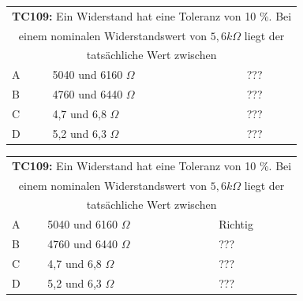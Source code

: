 \begin{frame}
	\begin{small}	
	\begin{tabular}{|l|l|l|}
	\hline
		\multicolumn{3}{|c|}{\textbf{TC109:} Ein Widerstand hat eine Toleranz von 10 \%. Bei }\\
		\multicolumn{3}{|c|}{einem nominalen Widerstandswert von $5,6 k\Omega$ liegt der}\\
		\multicolumn{3}{|c|}{tatsächliche Wert zwischen}\\
		\hline
		A & 5040 und 6160 $\Omega$ & ??? \\ \hline
		B & 4760 und 6440 $\Omega$ & ??? \\ \hline
		C & 4,7 und 6,8 $\Omega$ & ??? \\ \hline
		D & 5,2 und 6,3 $\Omega$ & ??? \\ \hline 		
	\end{tabular}
	\end{small}
\end{frame}
\begin{frame}
	\begin{small}	
	\begin{tabular}{|l|l|l|}
	\hline
		\multicolumn{3}{|c|}{\textbf{TC109:} Ein Widerstand hat eine Toleranz von 10 \%. Bei }\\
		\multicolumn{3}{|c|}{einem nominalen Widerstandswert von $5,6 k\Omega$ liegt der}\\
		\multicolumn{3}{|c|}{tatsächliche Wert zwischen}\\
		\hline
		A & 5040 und 6160 $\Omega$ & Richtig \\ \hline
		B & 4760 und 6440 $\Omega$ & ??? \\ \hline
		C & 4,7 und 6,8 $\Omega$ & ??? \\ \hline
		D & 5,2 und 6,3 $\Omega$ & ??? \\ \hline 		
	\end{tabular}
	\end{small}
\end{frame}


